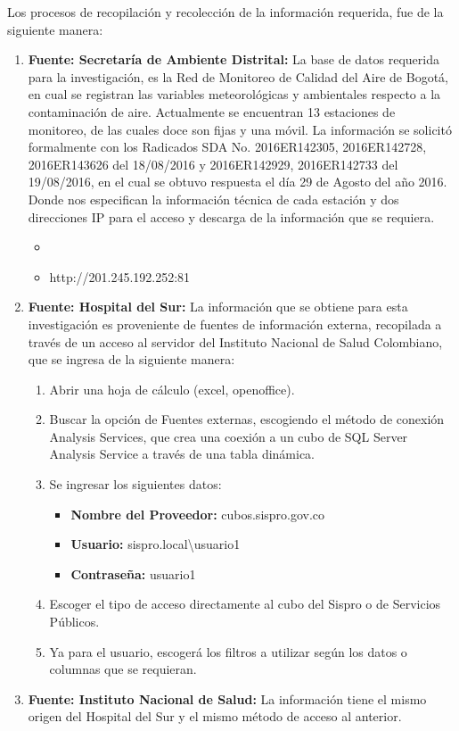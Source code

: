 \documentclass[a4paper,openright,12pt]{book}
\theoremstyle{definition}
\theoremstyle{remark}
\begin{document}
Los procesos de recopilación y recolección de la información requerida, fue de la siguiente manera:
\begin{enumerate}
	\item \textbf{Fuente: Secretaría de Ambiente Distrital:} La base de datos requerida para la investigación, es la Red de Monitoreo de Calidad del Aire de Bogotá, en cual se registran las variables meteorológicas y ambientales respecto a la contaminación de aire. Actualmente se encuentran 13 estaciones de monitoreo, de las cuales doce son fijas y una móvil. La información se solicitó formalmente con los Radicados SDA No. 2016ER142305, 2016ER142728, 2016ER143626 del 18/08/2016 y 2016ER142929, 2016ER142733 del 19/08/2016, en el cual se obtuvo respuesta el día 29 de Agosto del año 2016. Donde nos especifican la información técnica de cada estación y dos direcciones IP para el acceso y descarga de la información que se requiera.
    \begin{itemize}
		\item %
        \item http://201.245.192.252:81
	\end{itemize}
    \item \textbf{Fuente: Hospital del Sur:} La información  que se  obtiene para esta investigación es proveniente de fuentes de información externa, recopilada a través de un acceso al servidor del Instituto Nacional de Salud Colombiano, que se ingresa de la siguiente manera:
    \begin{enumerate}
		\item Abrir una hoja de cálculo (excel, openoffice).
        \item Buscar la opción de Fuentes externas, escogiendo el método de conexión Analysis Services, que crea una coexión a un cubo de SQL Server Analysis Service a través de una tabla dinámica.
        \item Se ingresar los siguientes datos:
            \begin{itemize}
				\item \textbf{Nombre del Proveedor:} cubos.sispro.gov.co
       			 \item \textbf{Usuario:} sispro.local\textbackslash usuario1
				\item \textbf{Contraseña:} usuario1
	\end{itemize}
    	\item Escoger el tipo de acceso directamente al cubo del Sispro o de Servicios Públicos.
        \item Ya para el usuario, escogerá los filtros a utilizar según los datos o columnas que se requieran.
	\end{enumerate}
    

    \item \textbf{Fuente: Instituto Nacional de Salud:} La información tiene el mismo origen del Hospital del Sur y el mismo método de acceso al anterior.
\end{enumerate}
\end{document}
